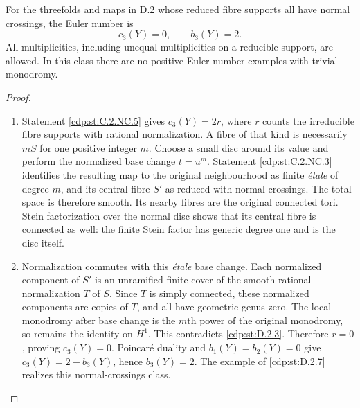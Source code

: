 \begin{proposition}\hypertarget{tag-01GB}{}\label{cdp:st:D.2.4}


For the threefolds and maps in D.2 whose reduced fibre supports
all have normal crossings, the Euler number is
\[
c_3(Y)=0,\qquad b_3(Y)=2.
\]
All multiplicities, including unequal multiplicities on a
reducible support, are allowed. In this class there are no
positive-Euler-number examples with trivial monodromy.
\end{proposition}


\begin{proof}

\begin{enumerate}[label={$\langle1\rangle$\arabic*.},leftmargin=*]
\item Statement \ref{cdp:st:C.2.NC.5} gives $c_3(Y)=2r$, where $r$ counts the
irreducible fibre supports with rational normalization. A fibre
of that kind is necessarily $mS$ for one positive integer $m$.
Choose a small disc around its value and perform the normalized
base change $t=u^m$. Statement \ref{cdp:st:C.2.NC.3} identifies the resulting
map to the original neighbourhood as finite \emph{\'etale} of
degree $m$, and its central fibre $S'$ as reduced with normal
crossings. The total space is therefore smooth. Its nearby
fibres are the original connected tori. Stein factorization
over the normal disc shows that its central fibre is connected
as well: the finite Stein factor has generic degree one and is
the disc itself.

\item Normalization commutes with this \emph{\'etale} base change.
Each normalized component of $S'$ is an unramified finite cover
of the smooth rational normalization $T$ of $S$. Since $T$ is
simply connected, these normalized components are copies of
$T$, and all have geometric genus zero. The local monodromy
after base change is the $m$th power of the original monodromy,
so remains the identity on $H^1$. This contradicts \ref{cdp:st:D.2.3}.
Therefore $r=0$, proving $c_3(Y)=0$. Poincar\'e duality and
$b_1(Y)=b_2(Y)=0$ give $c_3(Y)=2-b_3(Y)$, hence $b_3(Y)=2$.
The example of \ref{cdp:st:D.2.7} realizes this normal-crossings class.

\end{enumerate}
\end{proof}
